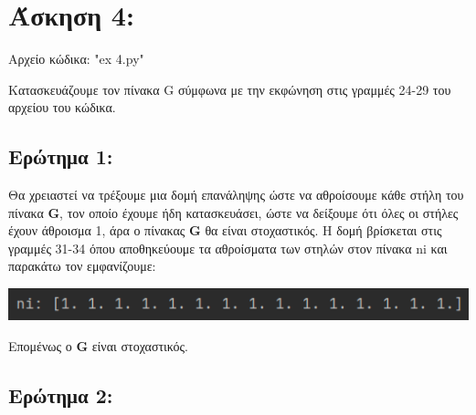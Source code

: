\documentclass{article}
\begin{document}
\section{Άσκηση 4:}

Αρχείο κώδικα: "ex 4.py"

Κατασκευάζουμε τον πίνακα G σύμφωνα με την εκφώνηση στις γραμμές 24-29 του αρχείου του κώδικα.

\subsection{Ερώτημα 1:}
Θα χρειαστεί να τρέξουμε μια δομή επανάληψης ώστε να αθροίσουμε κάθε στήλη του πίνακα \textbf{G}, τον οποίο έχουμε ήδη κατασκευάσει, ώστε να δείξουμε ότι όλες οι στήλες έχουν άθροισμα 1, άρα ο πίνακας \textbf{G} θα είναι στοχαστικός. Η δομή βρίσκεται στις γραμμές 31-34 όπου αποθηκεύουμε τα αθροίσματα των στηλών στον πίνακα ni και παρακάτω τον εμφανίζουμε:

\begin{center}\includegraphics[]{images/results_25.png}\end{center}

Επομένως ο \textbf{G} είναι στοχαστικός.

\subsection{Ερώτημα 2:}
\end{document}
